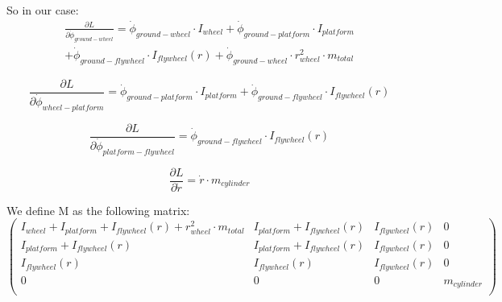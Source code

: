 So in our case:
\begin{multline}
	\frac{\partial L}{\partial \dot{\phi}_{ground-wheel}}=
	\dot{\phi}_{ground-wheel} \cdot I_{wheel}
	+ \dot{\phi}_{ground-platform} \cdot I_{platform}\\
	+ \dot{\phi}_{ground-flywheel}\cdot I_{flywheel}(r)
	+ \dot{\phi}_{ground-wheel}\cdot r_{wheel}^2\cdot m_{total}
\end{multline}

\begin{equation}
	\frac{\partial L}{\partial \dot{\phi}_{wheel-platform}}=
	\dot{\phi}_{ground-platform} \cdot I_{platform}
	+ \dot{\phi}_{ground-flywheel}\cdot I_{flywheel}(r)
\end{equation}

\begin{equation}
	\frac{\partial L}{\partial \dot{\phi}_{platform-flywheel}}=
	\dot{\phi}_{ground-flywheel}\cdot I_{flywheel}(r)
\end{equation}

\begin{equation}
	\frac{\partial L}{\partial \dot{r}}=
	\dot{r}\cdot m_{cylinder}
\end{equation}

We define M as the following matrix:
\begin{equation}
	\begin{pmatrix}
		I_{wheel} + I_{platform} + I_{flywheel}(r) + r_{wheel}^2 \cdot m_{total} &
		I_{platform} + I_{flywheel}(r)                                           &
		I_{flywheel}(r)                                                          &
		0                                                                          \\
		I_{platform} + I_{flywheel}(r)                                           &
		I_{platform} + I_{flywheel}(r)                                           &
		I_{flywheel}(r)                                                          &
		0                                                                          \\
		I_{flywheel}(r)                                                          &
		I_{flywheel}(r)                                                          &
		I_{flywheel}(r)                                                          &
		0                                                                          \\
		0                                                                        &
		0                                                                        &
		0                                                                        &
		m_{cylinder}                                                               \\
	\end{pmatrix}
\end{equation}

